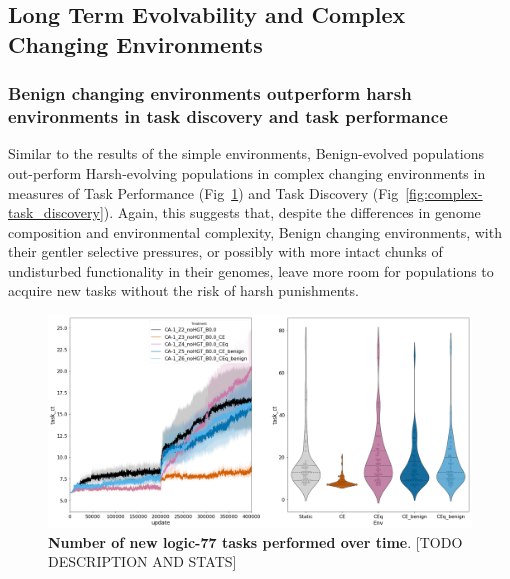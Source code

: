\documentclass[PhD]{msu-thesis}
\begin{document}

\subsection{Long Term Evolvability and Complex Changing Environments}

\subsubsection{Benign changing environments outperform harsh environments in task discovery and task performance}
Similar to the results of the simple environments, Benign-evolved populations out-perform Harsh-evolving populations in complex changing environments in measures of Task Performance (Fig~\ref{fig:complex-task_performance}) and Task Discovery (Fig~\ref{fig:complex-task_discovery}). Again, this suggests that, despite the differences in genome composition and environmental complexity, Benign changing environments, with their gentler selective pressures, or possibly with more intact chunks of undisturbed functionality in their genomes, leave more room for populations to acquire new tasks without the risk of harsh punishments. 

	\begin{figure}[!h]
	\includegraphics[trim={0 0 0 0}, clip, width=0.75\columnwidth]{figures/LTE/lte-complex-task_performance.png}
	\caption{\textbf{Number of new logic-77 tasks performed over time}. [TODO DESCRIPTION AND STATS]%
	}
	\label{fig:complex-task_performance}
	\end{figure}
\end{document}
